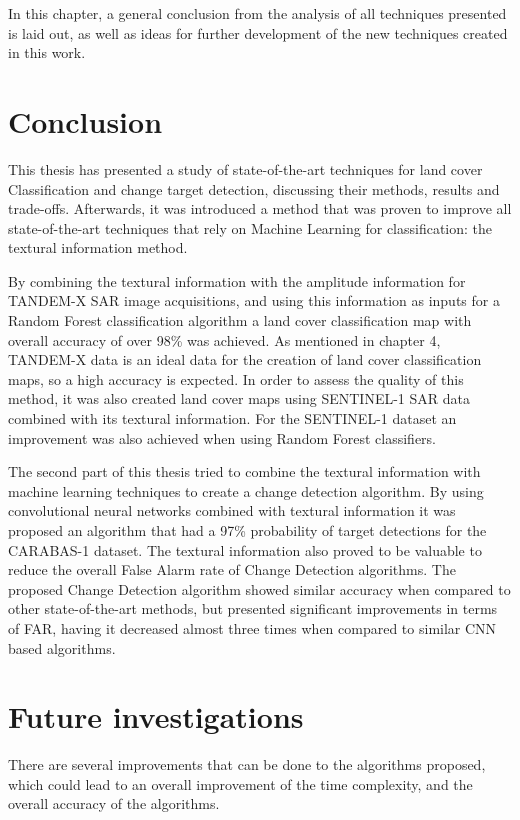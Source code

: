 In this chapter, a general conclusion from the analysis of all techniques presented is laid
out, as well as ideas for further development of the new techniques created in this work.

\section{Conclusion}

This thesis has presented a study of state-of-the-art techniques for land cover Classification and change target detection, discussing their methods, results and trade-offs. Afterwards, it was introduced a method that was proven to improve all state-of-the-art techniques that rely on Machine Learning for classification: the textural information method. 

By combining the textural information with the amplitude information for TANDEM-X SAR image acquisitions, and using this information as inputs for a Random Forest classification algorithm a land cover classification map with overall accuracy of over 98\% was achieved. As mentioned in chapter 4, TANDEM-X data is an ideal data for the creation of land cover classification maps, so a high accuracy is expected. In order to assess the quality of this method, it was also created land cover maps using SENTINEL-1 SAR data combined with its textural information. For the SENTINEL-1 dataset an improvement was also achieved when using Random Forest classifiers.

The second part of this thesis tried to combine the textural information with machine learning techniques to create a change detection algorithm. By using convolutional neural networks combined with textural information it was proposed an algorithm that had a 97\% probability of target detections for the CARABAS-1 dataset. The textural information also proved to be valuable to reduce the overall False Alarm rate of Change Detection algorithms. The proposed Change Detection algorithm showed similar accuracy
when compared to other state-of-the-art methods, but presented significant improvements in terms of FAR, having it decreased almost three times when compared to similar CNN based algorithms. 

\section{Future investigations}
There are several improvements that can be done to the algorithms proposed, which could lead to an overall improvement of the time complexity, and the overall accuracy of the algorithms.

